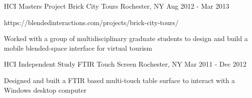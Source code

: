 \begin{cventries}
  \cventry
    {HCI Masters Project} %
    {Brick City Tours} %
    {Rochester, NY} %
    {Aug 2012 - Mar 2013} %
    {
      \begin{cvitems} %
        \item {https://blendedinteractions.com/projects/brick-city-tours/}
        \item {Worked with a group of multidisciplinary graduate students to design and build a mobile blended-space interface for virtual tourism}
      \end{cvitems}
    }

  \cventry
    {HCI Independent Study} %
    {FTIR Touch Screen} %
    {Rochester, NY} %
    {Mar 2011 - Dec 2012} %
    {
      \begin{cvitems} %
        \item {Designed and built a FTIR based multi-touch table surface to interact with a Windows desktop computer}
      \end{cvitems}
    }

\end{cventries}
